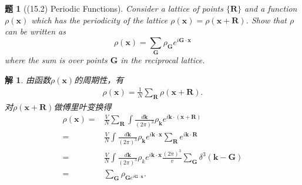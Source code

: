 \documentclass[UTF8,10pt,a4paper]{article}
\theoremstyle{Problem}
\newtheorem{prob}{题}
\theoremstyle{Solution}
\newtheorem*{sol}{解}
\begin{document}
\begin{prob}[(15.2) Periodic Functions]
    Consider a lattice of points $\{\bm{R}\}$ and a function $\rho(\bm{x})$ which has the periodicity of the lattice $\rho(\bm{x})=\rho(\bm{x}+\bm{R})$. Show that $\rho$ can be written as
    \[
        \rho(\bm{x})=\sum_{\bm{G}}\rho_{\bm{G}}e^{i\bm{G}\cdot\bm{x}}
    \]
    where the sum is over points $\bm{G}$ in the reciprocal lattice.
\end{prob}
\begin{sol}
    由函数$\rho(\bm{x})$的周期性，有
    \begin{align}
        \rho(\bm{x})=\frac{1}{N}\sum_{\bm{R}}\rho(\bm{x}+\bm{R}).
    \end{align}
    对$\rho(\bm{x}+\bm{R})$做傅里叶变换得
    \begin{align}
        \nonumber\rho(\bm{x})=&\frac{V}{N}\sum_{\bm{R}}\int\frac{d\bm{k}}{(2\pi)^3}\rho_{\bm{k}}e^{i\bm{k}\cdot(\bm{x}+\bm{R})}\\
        \nonumber=&\frac{V}{N}\int\frac{d\bm{k}}{(2\pi)^3}\rho_{\bm{k}}e^{i\bm{k}\cdot\bm{x}}\sum_{\bm{R}}e^{i\bm{k}\cdot\bm{R}}\\
        \nonumber=&\frac{V}{N}\int\frac{d\bm{k}}{(2\pi)^3}\rho_{k}e^{i\bm{k}\cdot\bm{x}}\frac{(2\pi)^3}{v}\sum_{\bm{G}}\delta^3(\bm{k}-\bm{G})\\
        =&\sum_{\bm{G}}\rho_{\bm{G}e^{i\bm{G}\cdot\bm{x}}}.
    \end{align}
\end{sol}
\end{document}
